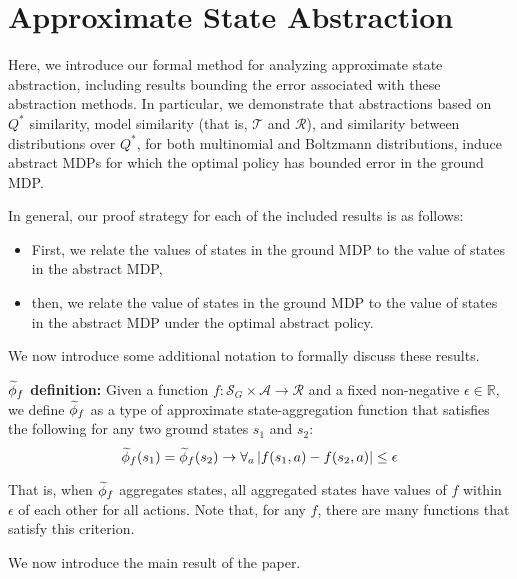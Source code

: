 \section{Approximate State Abstraction}

Here, we introduce our formal method for analyzing approximate state abstraction, including results bounding the error associated with these abstraction methods. In particular, we demonstrate that abstractions based on $Q^*$ similarity, model similarity (that is, $\mathcal{T}$ and $\mathcal{R}$), and similarity between distributions over $Q^*$, for both multinomial and Boltzmann distributions, induce abstract \acp{MDP} for which the optimal policy has bounded error in the ground MDP.

In general, our proof strategy for each of the included results is as follows:
\begin{itemize}
\item First, we relate the values of states in the ground MDP to the value of states in the abstract \ac{MDP},
\item then, we relate the value of states in the ground \ac{MDP} to the value of states in the abstract \ac{MDP} under the optimal abstract policy.
\end{itemize}


We now introduce some additional notation to formally discuss these results.

{\bf $\widetilde \phi_f$ definition:} Given a function $f: \mathcal{S}_G \times \mathcal{A} \rightarrow \mathcal{R}$ and a fixed non-negative $\epsilon \in \mathbb{R}$, we define $\widetilde \phi_f$ as a type of approximate state-aggregation function that satisfies the following for any two ground states $s_1$ and $s_2$: 
\begin{equation}
\label{eq:phi_f}
\widetilde \phi_f(s_1) = \widetilde \phi_f(s_2) \rightarrow \forall_a \left|f(s_1, a) - f(s_2, a)\right| \leq \epsilon
\end{equation}

That is, when $\widetilde \phi_f$ aggregates states, all aggregated states have values of $f$ within $\epsilon$ of each other for all actions. Note that, for any $f$, there are many functions that satisfy this criterion.

We now introduce the main result of the paper.

